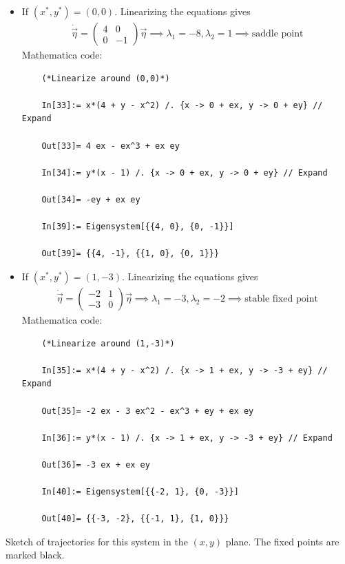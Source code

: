 \documentclass{article}
\theoremstyle{definition}
\begin{document}
\begin{itemize}
	
	
	\item If $(x^*, y^*) = (0,0)$. Linearizing the equations gives
	\begin{align*}
	\dot{\vec{\eta}} = \begin{pmatrix}
	4 & 0 \\ 0 & -1
	\end{pmatrix} \vec{\eta} \implies  \lambda_1 = -8, \lambda_2 = 1 \implies \text{saddle point}
	\end{align*}
	Mathematica code:
	\begin{lstlisting}
	(*Linearize around (0,0)*)
	
	In[33]:= x*(4 + y - x^2) /. {x -> 0 + ex, y -> 0 + ey} // Expand
	
	Out[33]= 4 ex - ex^3 + ex ey
	
	In[34]:= y*(x - 1) /. {x -> 0 + ex, y -> 0 + ey} // Expand
	
	Out[34]= -ey + ex ey
	
	In[39]:= Eigensystem[{{4, 0}, {0, -1}}]
	
	Out[39]= {{4, -1}, {{1, 0}, {0, 1}}}
	\end{lstlisting}
	
	
	\item If $(x^*, y^*) = (1,-3)$. Linearizing the equations gives
	\begin{align*}
	\dot{\vec{\eta}} = \begin{pmatrix}
	-2 & 1 \\ -3 & 0
	\end{pmatrix} \vec{\eta} \implies \lambda_1 = -3, \lambda_2 = -2 \implies \text{stable fixed point}
	\end{align*}
	Mathematica code:
	\begin{lstlisting}
	(*Linearize around (1,-3)*)
	
	In[35]:= x*(4 + y - x^2) /. {x -> 1 + ex, y -> -3 + ey} // Expand
	
	Out[35]= -2 ex - 3 ex^2 - ex^3 + ey + ex ey
	
	In[36]:= y*(x - 1) /. {x -> 1 + ex, y -> -3 + ey} // Expand
	
	Out[36]= -3 ex + ex ey
	
	In[40]:= Eigensystem[{{-2, 1}, {0, -3}}]
	
	Out[40]= {{-3, -2}, {{-1, 1}, {1, 0}}}
	\end{lstlisting}
\end{itemize}


Sketch of trajectories for this system in the $(x,y)$ plane. The fixed points are marked black. 
\end{document}
